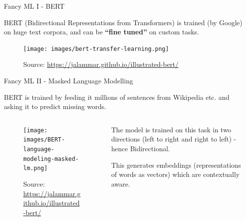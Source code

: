 \documentclass[9pt]{beamer}
\begin{document}
\begin{frame}{Fancy ML I - BERT}

BERT (Bidirectional Representations from Transformers) is trained (by Google) on huge text corpora, and can be \textbf{``fine tuned''} on custom tasks. 

\begin{figure}
\texttt{[image: images/bert-transfer-learning.png]}
\caption{Source: \url{https://jalammar.github.io/illustrated-bert/}}
\end{figure}

\end{frame}

\begin{frame}{Fancy ML II - Masked Language Modelling}

BERT is trained by feeding it millions of sentences from Wikipedia etc. and asking it to predict missing words.

\begin{columns}
\begin{column}{0.618\linewidth}
\begin{figure}
\texttt{[image: images/BERT-language-modeling-masked-lm.png]}
\caption{Source: \url{https://jalammar.github.io/illustrated-bert/}}
\end{figure}
\end{column}
\begin{column}{0.382\linewidth}
The model is trained on this task in two directions (left to right and right to left) - hence Bidirectional.

\medskip

This generates embeddings (representations of words as vectors) which are contextually aware.
\end{column}
\end{columns}

\end{frame}
\end{document}
